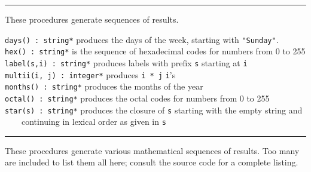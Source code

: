\vspace{0.25cm}\hrule{}

These procedures generate sequences of results. 

\texttt{days() : string*} produces the days of
the week, starting with
\texttt{"Sunday"}.\\
\texttt{hex() : string*} is the sequence of
hexadecimal codes for numbers from 0 to 255\\
\texttt{label(s,i) : string*} produces labels with prefix \texttt{s}
starting at \texttt{i}\\
\texttt{multii(i, j) : integer*} produces \texttt{i * j}
\texttt{i}'s\\
\texttt{months() : string*} produces the months of the year\\
\texttt{octal() : string*} produces the octal codes for
numbers from 0 to 255\\
\texttt{star(s) : string*} produces the closure of \texttt{s} starting with the
empty string and\\
 \ \ \ \ continuing in lexical order as given in \texttt{s} 

\vspace{0.25cm}\hrule{}

These procedures generate various mathematical
sequences of results. Too many are included to list
them all here; consult the source code for a complete listing.

